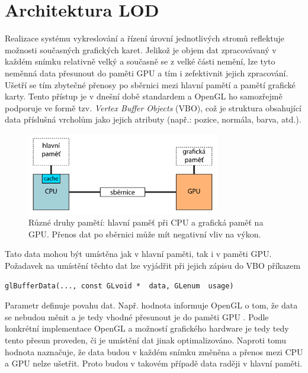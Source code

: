 \section{Architektura LOD}
\label{sec-LODarchitecture}
Realizace systému vykreslování a řízení úrovní jednotlivých stromů reflektuje možnosti současných grafických karet. Jelikož je objem dat zpracovávaný v každém snímku relativně velký a současně se z velké části nemění, lze tyto neměnná data přesunout do paměti GPU a tím i zefektivnit jejich zpracování. Ušetří se tím zbytečné přenosy po sběrnici mezi hlavní pamětí a pamětí grafické karty. Tento přístup je v dnešní době standardem a OpenGL ho samozřejmě podporuje ve formě tzv. \emph{Vertex Buffer Objects} (VBO), což je struktura obsahující data příslušná vrcholům jako jejich atributy (např.: pozice, normála, barva, atd.). 

\begin{figure}[!hbt]
\begin{center}
\includegraphics[width=0.75\textwidth]{./figures/CPUaGPU.png}
\end{center}
\caption[Různé druhy pamětí]%
{Různé druhy pamětí: hlavní paměť při CPU a grafická paměť na GPU. Přenos dat po sběrnici může mít negativní vliv na výkon.
\label{fig:CPUaGPU}
}
\end{figure}

Tato data mohou být umístěna jak v hlavní paměti, tak i v paměti GPU. Požadavek na umístění těchto dat lze vyjádřit při jejich zápisu do VBO příkazem 
\begin{verbatim}glBufferData(..., const GLvoid *  data, GLenum  usage)\end{verbatim}
Parametr  definuje povahu dat. Např. hodnota  informuje OpenGL o tom, že data se nebudou měnit a je tedy vhodné přesunout je do paměti GPU . Podle konkrétní implementace OpenGL a možností grafického hardware je tedy tedy tento přesun proveden, či je umístění dat jinak optimalizováno. Naproti tomu hodnota  naznačuje, že data budou v každém snímku změněna a přenos mezi CPU a GPU nelze ušetřit. Proto budou v takovém případě data raději v hlavní paměti.

